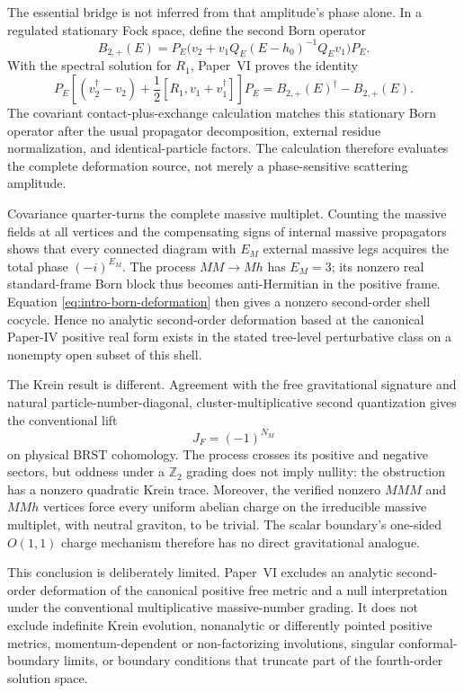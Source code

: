 \documentclass[11pt]{article}
\theoremstyle{remark}
\newcommand{\dg}{\dagger}
\begin{document}
The essential bridge is not inferred from that amplitude's phase alone.
In a regulated stationary Fock space, define the second Born operator
\begin{equation}
B_{2,+}(E)=P_E\bigl(v_2+v_1Q_E(E-h_0)^{-1}Q_Ev_1\bigr)P_E .
\end{equation}
With the spectral solution for $R_1$, Paper~VI proves the identity
\begin{equation}
P_E\left[(v_2^{\dg}-v_2)
+\frac12[R_1,v_1+v_1^{\dg}]\right]P_E
=B_{2,+}(E)^{\dg}-B_{2,+}(E).
\label{eq:intro-born-deformation}
\end{equation}
The covariant contact-plus-exchange calculation matches this stationary
Born operator after the usual propagator decomposition, external residue
normalization, and identical-particle factors.  The calculation therefore
evaluates the complete deformation source, not merely a phase-sensitive
scattering amplitude.

Covariance quarter-turns the complete massive multiplet.  Counting the
massive fields at all vertices and the compensating signs of internal
massive propagators shows that every connected diagram with $E_M$
external massive legs acquires the total phase $(-i)^{E_M}$.  The process
$MM\to Mh$ has $E_M=3$; its nonzero real standard-frame Born block thus
becomes anti-Hermitian in the positive frame.  Equation
\eqref{eq:intro-born-deformation} then gives a nonzero second-order shell
cocycle.  Hence no analytic second-order deformation based at the
canonical Paper-IV positive real form exists in the stated tree-level
perturbative class on a nonempty open subset of this shell.

The Krein result is different.  Agreement with the free gravitational
signature and natural particle-number-diagonal, cluster-multiplicative
second quantization gives the conventional lift
\begin{equation}
J_F=(-1)^{N_M}
\end{equation}
on physical BRST cohomology.  The process crosses its positive and
negative sectors, but oddness under a $\mathbb Z_2$ grading does not imply
nullity: the obstruction has a nonzero quadratic Krein trace.  Moreover,
the verified nonzero $MMM$ and $MMh$ vertices force every uniform
abelian charge on the irreducible massive multiplet, with
neutral graviton, to be trivial.  The scalar boundary's one-sided
$O(1,1)$ charge mechanism therefore has no direct gravitational analogue.

This conclusion is deliberately limited.  Paper~VI excludes an analytic
second-order deformation of the canonical positive free metric and a
null interpretation under the conventional multiplicative massive-number
grading.  It does not exclude indefinite Krein evolution, nonanalytic or
differently pointed positive metrics, momentum-dependent or
non-factorizing involutions, singular conformal-boundary limits, or
boundary conditions that truncate part of the fourth-order solution
space.
\end{document}
